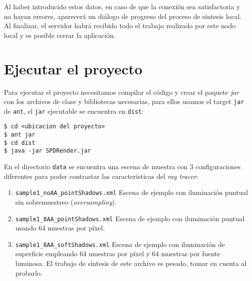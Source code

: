 \documentclass[]{article}
\begin{document}
Al haber introducido estos datos, en caso de que la conexión sea satisfactoria y no hayan errores, aparecerá un diálogo de progreso del proceso de síntesis local.  Al finalizar, el servidor habrá recibido todo el trabajo realizado por este nodo local y es posible
cerrar la aplicación.

\section{Ejecutar el proyecto}

Para ejecutar el proyecto necesitamos compilar el código y crear el paquete \emph{jar} con los archivos de clase y bibliotecas necesarias, para ellos usamos el target \texttt{jar} de \texttt{ant}, el \texttt{jar} ejecutable se encuentra en \texttt{dist}:

\begin{verbatim}
$ cd <ubicacion del proyecto>
$ ant jar
$ cd dist
$ java -jar SPDRender.jar
\end{verbatim}

En el directorio \texttt{data} se encuentra una escena de muestra con 3 configuraciones diferentes para poder contrastar las
características del \emph{ray tracer}:

\begin{enumerate}
 \item \texttt{sample1\_noAA\_pointShadows.xml} Escena de ejemplo con iluminación puntual sin sobremuestreo (\emph{oversampling}).
 \item \texttt{sample1\_8AA\_pointShadows.xml}  Escena de ejemplo con iluminación puntual usando 64 muestras por píxel.
 \item \texttt{sample1\_8AA\_softShadows.xml} Escena de ejemplo con iluminación de superficie empleando 64 muestras por píxel y 64 
 muestras por fuente luminosa. El trabajo de síntesis de este archivo es pesado, tomar en cuenta al probarlo.
\end{enumerate}
\end{document}
